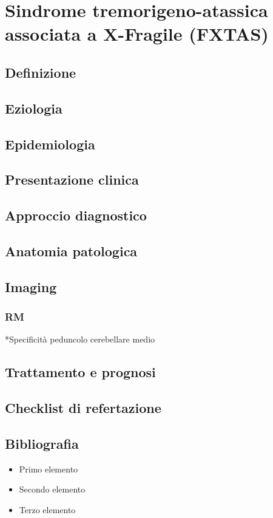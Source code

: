 \section{Sindrome tremorigeno-atassica associata a X-Fragile (FXTAS)}

\subsection{Definizione}

\subsection{Eziologia}

\subsection{Epidemiologia}

\subsection{Presentazione  clinica}

\subsection{Approccio diagnostico}

\subsection{Anatomia patologica}

\subsection{Imaging}
\subsubsection{RM}
*Specificità peduncolo cerebellare medio

\subsection{Trattamento e prognosi}

\subsection{Checklist di refertazione}

\subsection{Bibliografia}
\small{
	
	
}


\begin{itemize}[label=$\square$] %
	\item Primo elemento
	\item Secondo elemento
	\item Terzo elemento
\end{itemize}